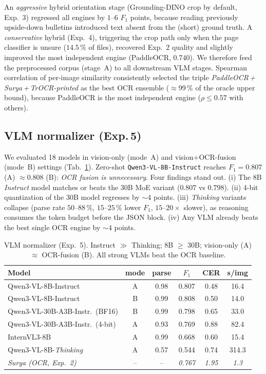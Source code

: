 An \emph{aggressive} hybrid orientation stage (Grounding-DINO crop by default,
Exp.~3) regressed all engines by $1$--$6$ $F_1$ points, because reading
previously upside-down bulletins introduced text absent from the (short) ground
truth. A \emph{conservative} hybrid (Exp.~4), triggering the crop path only
when the page classifier is unsure ($14.5\,\%$ of files), recovered Exp.~2
quality and slightly improved the most independent engine (PaddleOCR, $0.740$).
We therefore feed the preprocessed corpus (stage~A) to all downstream VLM
stages. Spearman correlation of per-image similarity consistently selected the
triple \emph{PaddleOCR\,+\,Surya\,+\,TrOCR-printed} as the best OCR ensemble
($\approx$99\,\% of the oracle upper bound), because PaddleOCR is the most
independent engine ($\rho\!\le\!0.57$ with others).

\subsection{VLM normalizer (Exp.\,5)}
\label{sec:vlm}
We evaluated 18 models in vision-only (mode~A) and vision+OCR-fusion (mode~B)
settings (Tab.~\ref{tab:vlm}). Zero-shot \texttt{Qwen3-VL-8B-Instruct} reaches
$F_1=0.807$ (A) $\approx0.808$ (B): \emph{OCR fusion is unnecessary}. Four
findings stand out. (i) The 8B \emph{Instruct} model matches or beats the 30B
MoE variant ($0.807$ vs $0.798$). (ii) 4-bit quantization of the 30B model
regresses by $\sim$4 points. (iii) \emph{Thinking} variants collapse (parse
rate $50$--$88\,\%$, $15$--$25\,\%$ lower $F_1$, $15$--$20\times$ slower), as
reasoning consumes the token budget before the JSON block. (iv) Any VLM already
beats the best single OCR engine by $\sim$4 points.

\begin{table}[t]
\centering
\small
\setlength{\tabcolsep}{3pt}
\begin{tabular}{@{}lccccc@{}}
\toprule
Model & mode & parse & $F_1$ & CER & s/img \\
\midrule
Qwen3-VL-8B-Instruct       & A & 0.98 & 0.807 & 0.48 & 16.4 \\
Qwen3-VL-8B-Instruct       & B & 0.99 & 0.808 & 0.50 & 14.0 \\
Qwen3-VL-30B-A3B-Instr.\ (BF16) & B & 0.99 & 0.798 & 0.65 & 33.0 \\
Qwen3-VL-30B-A3B-Instr.\ (4-bit)& A & 0.93 & 0.769 & 0.88 & 82.4 \\
InternVL3-8B               & A & 0.99 & 0.668 & 0.60 & 15.4 \\
Qwen3-VL-8B-\emph{Thinking}& A & 0.57 & 0.544 & 0.74 & 314.3 \\
\midrule
\textit{Surya (OCR, Exp.~2)} & -- & -- & \textit{0.767} & \textit{1.95} & \textit{1.3} \\
\bottomrule
\end{tabular}
\caption{VLM normalizer (Exp.~5). Instruct $\gg$ Thinking; 8B $\ge$ 30B;
vision-only (A) $\approx$ OCR-fusion (B). All strong VLMs beat the OCR
baseline.}
\label{tab:vlm}
\end{table}

